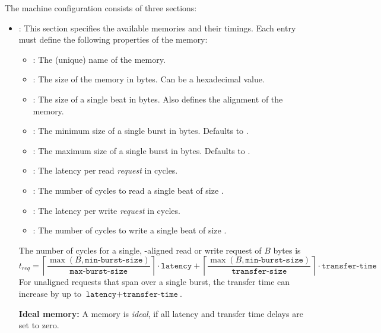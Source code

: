 The machine configuration consists of three sections:
\begin{itemize}
\item {}: This section specifies the available memories and their timings. Each entry must define
  the following properties of the memory:

  \begin{itemize}
  \item {}: The (unique) name of the memory.
  \item {}: The size of the memory in bytes. Can be a hexadecimal value.
  \item {}: The size of a single beat in bytes. Also defines the alignment of the memory.


  \item {}: The minimum size of a single burst in bytes. Defaults to .
  \item {}: The maximum size of a single burst in bytes. Defaults to .
  
  \item {}: The latency per read \emph{request} in cycles.
  \item {}: The number of cycles to read a single beat of size .
  \item {}: The latency per write \emph{request} in cycles.
  \item {}: The number of cycles to write a single beat of size .
  \end{itemize}

  The number of cycles for a single, -aligned read or write request of $B$ bytes is 
  \[
  t_{req} = \left\lceil \frac{\max(B, \texttt{min-burst-size})}{\texttt{max-burst-size}}\right\rceil \cdot \texttt{latency} +
            \left\lceil \frac{\max(B, \texttt{min-burst-size})}{\texttt{transfer-size}}\right\rceil \cdot \texttt{transfer-time}
  \]
  For unaligned requests that span over a single burst, the transfer time can increase by up to $\texttt{latency} + \texttt{transfer-time}$.

  \textbf{Ideal memory:} A memory is \emph{ideal}, if all latency and transfer time delays are set to zero.


\end{itemize}
